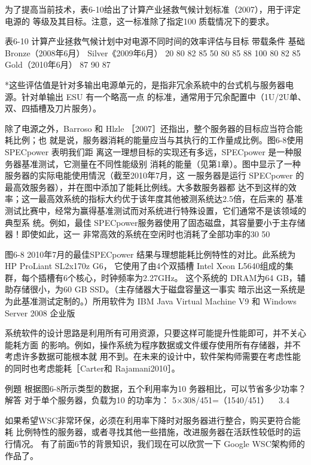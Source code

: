 为了提高当前技术，表6-10给出了计算产业拯救气候计划标准（2007），用于评定电源的
等级及其目标。注意，这一标准除了指定100%
质载情况下的要求。

表6-10
计算产业拯救气候计划中对电源不同时间的效率评估与目标
带载条件
基础
Bronze（2008年6月）
Silver《2009年6月）
20%
80%
82%
85%
50%
80%
85%
88%
100%
80%
82%
85%
Gold（2010年6月）
87%
90%
87%

*这些评估值是针对多输出电源单元的，是指非冗余系統中的台式机与服务器电源。针对单输出 ESU 有一个略高一点
的标准，通常用于冗余配置中（1U/2U单、双、四插槽及刀片服务）。

除了电源之外，Barroso 和 Hlzle ［2007］还指出，整个服务器的目标应当符合能耗比例；也
就是说，服务器消耗的能量应当与其执行的工作量成比例。图6-8使用 SPECpower 表明我们距
离这一理想目标的实现还有多远，SPECpower 是一种服务器基准测试，它测量在不同性能级别
消耗的能量（见第1章）。图中显示了一种服务器的实际电能使用情況（截至2010年7月，这
一服务器是运行 SPECpower 的最高效服务器），并在图中添加了能耗比例线。大多数服务器都
达不到这样的效率；这一最高效系统的指标大约优于该年度其他被测系统达2.5倍，在后来的
基准测试比赛中，经常为赢得基准测试而对系统进行特殊设置，它们通常不是该领域的典型系
统。例如，最佳 SPECpower服务器使用了固态磁盘，其容量要小于主存储器！即使如此，这一
非常高效的系统在空闲时也消耗了全部功率的30%
50%

图6-8
2010年7月的最佳SPECpower 结果与理想能耗比例特性的对比。此系统为 HP ProLiant SL2x170z G6，
它使用了由4个双插槽 Intel Xeon L5640组成的集群，每个插槽有6个核心，时钟频率为2.27GHz。
这个系统的 DRAM为64 GB，辅助存储很小，为60 GB SSD。（主存储器大于磁盘容量这一事实
暗示出这一系统是为此基准测试定制的。）所用软件为 IBM Java Virtual Machine V9 和 Windows
Server 2008 企业版

系统软件的设计思路是利用所有可用资源，只要这样可能提升性能即可，并不关心能耗方面
的影响。例如，操作系统为程序数据或文件缓存使用所有存储器，并不考虑许多数据可能根本就
用不到。在未来的设计中，软件架构师需要在考虑性能的同时也考虑能耗［Carter和 Rajamani2010］。

例題
根据图6-8所示类型的数据，五个利用率为10%
务器相比，可以节省多少功率？
解答
对于单个服务器，负载为10%
的功率为：
5×308/451=（1540/451） ~ 3.4

如果希望WSC非常环保，必须在利用率下降时对服务器进行整合，购买更符合能耗
比例特性的服务器，或者寻找其他一些措施，改进服务器在活跃性较低时的运行情况。
有了前面6节的背景知识，我们现在可以欣赏一下 Google WSC架构师的作品了。

